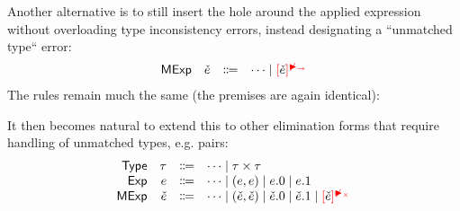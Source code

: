 \documentclass{article}
\begin{document}
Another alternative is to still insert the hole around the applied expression without overloading
type inconsistency errors, instead designating a ``unmatched type`` error:
%
\[\begin{array}{rrcl}
  \ECMName & \ECMV & \Coloneqq & \cdots \mid \ECInconMatchedArrow{\ECMV}
\end{array}\]
%
The rules remain much the same (the premises are again identical):
%
\begin{mathpar}

\end{mathpar}

It then becomes natural to extend this to other elimination forms that require handling of unmatched
types, e.g. pairs:
%
\[\begin{array}{rrcl}
  \TMName  & \TMV  & \Coloneqq & \cdots \mid \TPair{\TMV}{\TMV} \\
  \EMName  & \EMV  & \Coloneqq & \cdots
                               \mid \EPair{\EMV}{\EMV} 
                               \mid \EProjL{\EMV} \mid \EProjR{\EMV} \\
  \ECMName & \ECMV & \Coloneqq & \cdots 
                               \mid \ECPair{\ECMV}{\ECMV} 
                               \mid \ECProjL{\ECMV} \mid \ECProjR{\ECMV}
                               \mid \ECInconMatchedPair{\ECMV}
\end{array}\]
\end{document}
